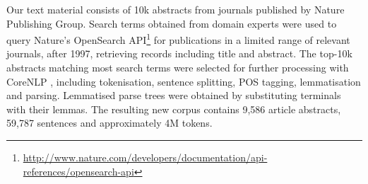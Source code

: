 \documentclass[11pt]{article}
\begin{document}

Our text material consists of 10k abstracts from journals published by Nature Publishing Group.
Search terms obtained from domain experts were used to query Nature's OpenSearch API\footnote{\url{http://www.nature.com/developers/documentation/api-references/opensearch-api}} for publications in a limited range of relevant journals, after 1997, retrieving records including title and abstract.
The top-10k abstracts matching most search terms were selected for further processing with CoreNLP \cite{manning-EtAl:2014:P14-5}, including  tokenisation, sentence splitting, POS tagging, lemmatisation and parsing.
Lemmatised parse trees were obtained by substituting terminals with their lemmas.
The resulting new corpus contains 9,586 article abstracts, 59,787 sentences and approximately 4M tokens.
\end{document}
